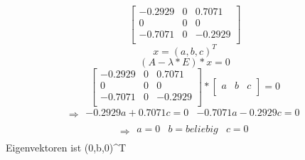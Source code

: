 \documentclass{article}
\begin{document}
\[
\left[ \begin{array}{ccc}
        -0.2929        & 0   & 0.7071  \\
        0              & 0   & 0 \\
        -0.7071        & 0   & -0.2929 \\
\end{array}
\right]
\]
\[
x=(a,b,c)^{T}
\]
\[
(A-\lambda*E)*x=0
\]
\[
\left[ \begin{array}{ccc}
        -0.2929        & 0   & 0.7071  \\
        0              & 0   & 0 \\
        -0.7071        & 0   & -0.2929 \\
\end{array}
\right]*\left[ \begin{array}{c}
        a & b & c  \\
\end{array}
\right]=0
\]
\[
\Rightarrow  \begin{array}{c}
        -0.2929a+0.7071c=0 & -0.7071a-0.2929c=0 \\
\end{array}
\]
\[
\Rightarrow  \begin{array}{c}
        a=0 & b=beliebig & c=0 \\
\end{array}
\]
Eigenvektoren ist (0,b,0)^{T}
\end{document}
